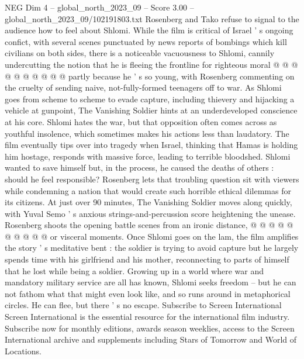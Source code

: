 \begin{textsample}{NEG Dim 4 – global\_north\_2023\_09 – Score 3.00 – global\_north\_2023\_09/102191803.txt}
Rosenberg and Tako refuse to signal to the audience how to feel about Shlomi.
While the film is critical of Israel ' s ongoing confict, with several scenes punctuated by news reports of bombings which kill civilians on both sides, there is a noticeable vacuousness to Shlomi, cannily undercutting the notion that he is fleeing the frontline for righteous moral @ @ @ @ @ @ @ @ @ @ partly because he ' s so young, with Rosenberg commenting on the cruelty of sending naive, not-fully-formed teenagers off to war.
As Shlomi goes from scheme to scheme to evade capture, including thievery and hijacking a vehicle at gunpoint, The Vanishing Soldier hints at an underdeveloped conscience at his core.
Shlomi hates the war, but that opposition often comes across as youthful insolence, which sometimes makes his actions less than laudatory.
The film eventually tips over into tragedy when Israel, thinking that Hamas is holding him hostage, responds with massive force, leading to terrible bloodshed.
Shlomi wanted to save himself but, in the process, he caused the deaths of others : should he feel responsible?
Rosenberg lets that troubling question sit with viewers while condemning a nation that would create such horrible ethical dilemmas for its citizens.
At just over 90 minutes, The Vanishing Soldier moves along quickly, with Yuval Semo ' s anxious strings-and-percussion score heightening the unease.
Rosenberg shoots the opening battle scenes from an ironic distance, @ @ @ @ @ @ @ @ @ @ or visceral moments.
Once Shlomi goes on the lam, the film amplifies the story ' s meditative bent : the soldier is trying to avoid capture but he largely spends time with his girlfriend and his mother, reconnecting to parts of himself that he lost while being a soldier.
Growing up in a world where war and mandatory military service are all has known, Shlomi seeks freedom -- but he can not fathom what that might even look like, and so runs around in metaphorical circles.
He can flee, but there ' s no escape.
Subscribe to Screen International Screen International is the essential resource for the international film industry.
Subscribe now for monthly editions, awards season weeklies, access to the Screen International archive and supplements including Stars of Tomorrow and World of Locations.

\end{textsample}
